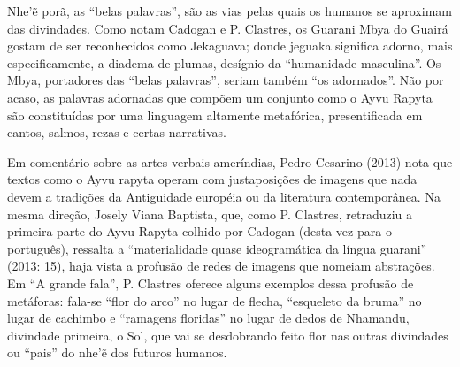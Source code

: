 Nhe’ẽ porã, as ``belas palavras'', são as vias pelas quais os
humanos se aproximam das divindades. Como notam Cadogan e P. Clastres,
os Guarani Mbya do Guairá gostam de ser reconhecidos como Jekaguava;
donde jeguaka significa adorno, mais especificamente, a diadema de
plumas, desígnio da ``humanidade masculina''. Os Mbya, portadores das
``belas palavras'', seriam também ``os adornados''. Não por acaso, as
palavras adornadas que compõem um conjunto como o Ayvu Rapyta são
constituídas por uma linguagem altamente metafórica, presentificada em
cantos, salmos, rezas e certas narrativas. 

Em comentário sobre as artes verbais ameríndias, Pedro Cesarino (2013)
nota que textos como o Ayvu rapyta operam com justaposições de imagens
que nada devem a tradições da Antiguidade européia ou da literatura
contemporânea. Na mesma direção, Josely Viana Baptista, que, como P.
Clastres, retraduziu a primeira parte do Ayvu Rapyta colhido por
Cadogan (desta vez para o português), ressalta a ``materialidade quase
ideogramática da língua guarani'' (2013: 15), haja vista a profusão de
redes de imagens que nomeiam abstrações. Em ``A grande fala'', P. Clastres
oferece alguns exemplos dessa profusão de metáforas: fala-se ``flor do
arco'' no lugar de flecha, ``esqueleto da bruma'' no lugar de cachimbo e
``ramagens floridas'' no lugar de dedos de Nhamandu, divindade primeira,
o Sol, que vai se desdobrando feito flor nas outras divindades ou
``pais'' do nhe’ẽ dos futuros humanos.


